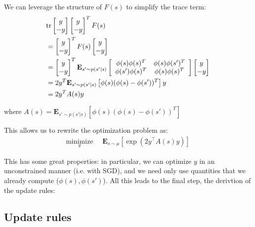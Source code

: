 We can leverage the structure of $F(s)$ to simplify the trace term:
\begin{align}
   & \text{tr}  \begin{bmatrix} y \\ -y \end{bmatrix} \begin{bmatrix} y \\ -y \end{bmatrix}^T F(s)
  \\ & = \begin{bmatrix} y \\ -y \end{bmatrix}^T F(s) \begin{bmatrix} y \\ -y \end{bmatrix}
  \\ & =  \begin{bmatrix} y \\ -y \end{bmatrix}^T  \mathbf{E}_{s' \sim p(s'|s)}  \left[ \begin{array}{cc} \phi(s)\phi(s)^T & \phi(s)\phi(s')^T \\ \phi(s')\phi(s)^T & \phi(s)\phi(s)^T \end{array} \right]
  \begin{bmatrix} y \\ -y \end{bmatrix}
  \\  & =  2 y^T \mathbf{E}_{s' \sim p(s'|s)} \left [\phi(s)(\phi(s)- \phi(s'))^T \right ] y
  \\  & =  2 y^T A(s) y
\end{align}

where $A(s) = \mathbf{E}_{s' \sim p(s'|s)} \left [\phi(s)(\phi(s)- \phi(s'))^T \right ]$

This allows us to rewrite the optimization problem as:
\begin{align}
  \underset{y}{\text{minimize}} & \;\; \mathbf{E}_{s\sim\mu} \left [ \exp\left(2 y^\top A(s) y \right)  \right ]
\end{align}

This has some great properties: in particular, we can optimize $y$ in an unconstrained manner (i.e. with SGD), and we need only use quantities that we already compute ($\phi(s), \phi(s')$). All this leads to the final step, the derivtion of the update rules:


\subsection{Update rules}

